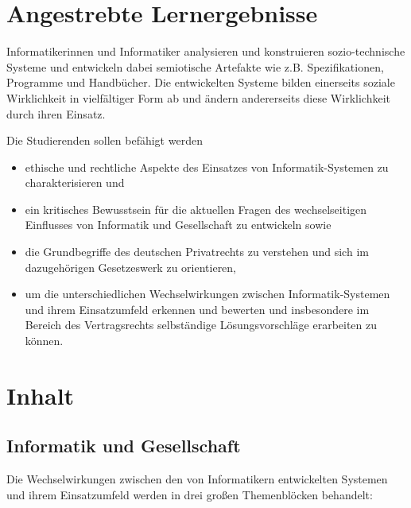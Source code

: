 \section*{Angestrebte
Lernergebnisse\label{/mi-2017/modulbeschreibungen-bachelor/BA_MUG}}\label{angestrebte-lernergebnissepathlabelmi-2017modulbeschreibungen-bachelorbaux5fmug}

Informatikerinnen und Informatiker analysieren und konstruieren
sozio-technische Systeme und entwickeln dabei semiotische Artefakte wie
z.B. Spezifikationen, Programme und Handbücher. Die entwickelten Systeme
bilden einerseits soziale Wirklichkeit in vielfältiger Form ab und
ändern andererseits diese Wirklichkeit durch ihren Einsatz.

Die Studierenden sollen befähigt werden

\begin{itemize}
\tightlist
\item
  ethische und rechtliche Aspekte des Einsatzes von Informatik-Systemen
  zu charakterisieren und
\item
  ein kritisches Bewusstsein für die aktuellen Fragen des
  wechselseitigen Einflusses von Informatik und Gesellschaft zu
  entwickeln sowie
\item
  die Grundbegriffe des deutschen Privatrechts zu verstehen und sich im
  dazugehörigen Gesetzeswerk zu orientieren,
\item
  um die unterschiedlichen Wechselwirkungen zwischen Informatik-Systemen
  und ihrem Einsatzumfeld erkennen und bewerten und insbesondere im
  Bereich des Vertragsrechts selbständige Lösungsvorschläge erarbeiten
  zu können.
\end{itemize}

\section*{Inhalt\label{/mi-2017/modulbeschreibungen-bachelor/BA_MUG}}\label{inhaltpathlabelmi-2017modulbeschreibungen-bachelorbaux5fmug}

\subsection*{Informatik und
Gesellschaft\label{/mi-2017/modulbeschreibungen-bachelor/BA_MUG}}\label{informatik-und-gesellschaftpathlabelmi-2017modulbeschreibungen-bachelorbaux5fmug}

Die Wechselwirkungen zwischen den von Informatikern entwickelten
Systemen und ihrem Einsatzumfeld werden in drei großen Themenblöcken
behandelt:

